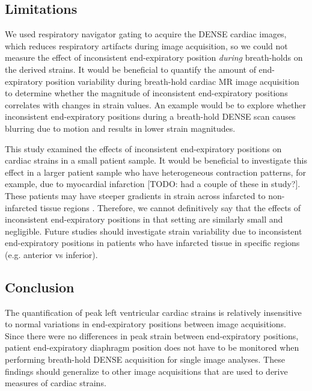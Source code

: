 \subsection{Limitations}
	We used respiratory navigator gating to acquire the DENSE cardiac images, which reduces respiratory artifacts during image acquisition, so we could not measure the effect of inconsistent end-expiratory position \textit{during} breath-holds on the derived strains. It would be beneficial to quantify the amount of end-expiratory position variability during breath-hold cardiac MR image acquisition to determine whether the magnitude of inconsistent end-expiratory positions correlates with changes in strain values. An example would be to explore whether inconsistent end-expiratory positions during a breath-hold DENSE scan causes blurring due to motion and results in lower strain magnitudes.
	
	This study examined the effects of inconsistent end-expiratory positions on cardiac strains in a small patient sample. It would be beneficial to investigate this effect in a larger patient sample who have heterogeneous contraction patterns, for example, due to myocardial infarction [TODO: had a couple of these in study?]. These patients may have steeper gradients in strain across infarcted to non-infarcted tissue regions \cite{Pahlm2014}. Therefore, we cannot definitively say that the effects of inconsistent end-expiratory positions in that setting are similarly small and negligible. Future studies should investigate strain variability due to inconsistent end-expiratory positions in patients who have infarcted tissue in specific regions (e.g. anterior vs inferior).

\subsection{Conclusion}
	The quantification of peak left ventricular cardiac strains is relatively insensitive to normal variations in end-expiratory positions between image acquisitions. Since there were no differences in peak strain between end-expiratory positions, patient end-expiratory diaphragm position does not have to be monitored when performing breath-hold DENSE acquisition for single image analyses. These findings should generalize to other image acquisitions that are used to derive measures of cardiac strains.
	
	
	
